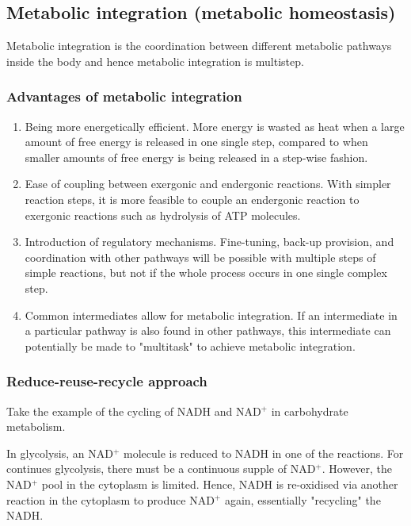 \documentclass[11pt]{article}
\begin{document}
\newpage
\subsection{Metabolic integration (metabolic homeostasis)}
\label{sec:orgf98a7a6}
Metabolic integration is the coordination between different metabolic pathways inside the body and hence metabolic integration is multistep.
\subsubsection{Advantages of metabolic integration}
\label{sec:orgcf22b2b}
\begin{enumerate}
\item Being more energetically efficient. More energy is wasted as heat when a large amount of free energy is released in one single step, compared to when smaller amounts of free energy is being released in a step-wise fashion.
\item Ease of coupling between exergonic and endergonic reactions. With simpler reaction steps, it is more feasible to couple an endergonic reaction to exergonic reactions such as hydrolysis of ATP molecules.
\item Introduction of regulatory mechanisms. Fine-tuning, back-up provision, and coordination with other pathways will be possible with multiple steps of simple reactions, but not if the whole process occurs in one single complex step.
\item Common intermediates allow for metabolic integration. If an intermediate in a particular pathway is also found in other pathways, this intermediate can potentially be made to "multitask" to achieve metabolic integration.
\end{enumerate}

\newpage
\subsubsection{Reduce-reuse-recycle approach}
\label{sec:org79d06c3}
Take the example of the cycling of NADH and NAD\(^+\) in carbohydrate metabolism.


In glycolysis, an NAD\(^+\) molecule is reduced to NADH in one of the reactions. For continues glycolysis, there must be a continuous supple of NAD\(^+\). However, the NAD\(^+\) pool in the cytoplasm is limited. Hence, NADH is re-oxidised via another reaction in the cytoplasm to produce NAD\(^+\) again, essentially "recycling" the NADH.
\end{document}
